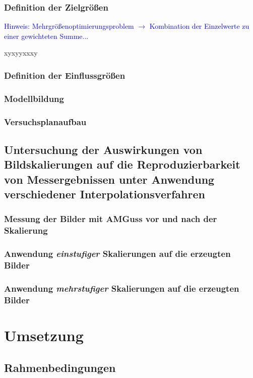 \documentclass[
fontsize=10pt, 
listof = totoc,
parskip = half	
]{report}
\begin{document}
\subsection{Definition der Zielgrößen}

\textcolor{blue}{Hinweis: Mehrgrößenoptimierungsproblem $\to$ Kombination der Einzelwerte zu einer gewichteten Summe...}

xyxyyxxxy

\subsection{Definition der Einflussgrößen}

\subsection{Modellbildung}

\subsection{Versuchsplanaufbau}

\section{Untersuchung der Auswirkungen von Bildskalierungen auf die Reproduzierbarkeit von Messergebnissen unter Anwendung verschiedener Interpolationsverfahren}

\subsection{Messung der Bilder mit AMGuss vor und nach der Skalierung}

\subsection{Anwendung \textit{einstufiger} Skalierungen auf die erzeugten Bilder}

\subsection{Anwendung \textit{mehrstufiger} Skalierungen auf die erzeugten Bilder}


\chapter{Umsetzung}

\section{Rahmenbedingungen}
\end{document}
